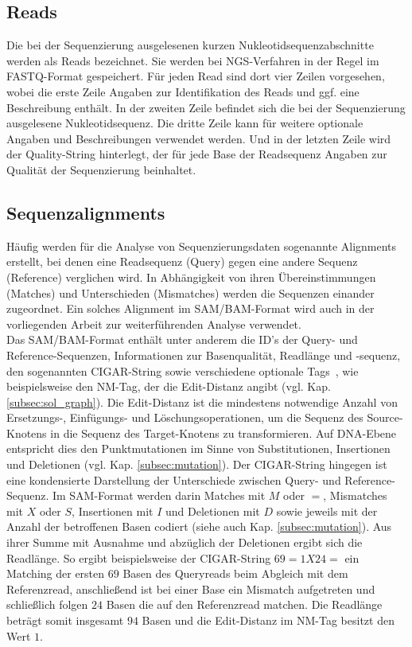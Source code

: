 \subsection{Reads} \label{subsec:fastq}

Die bei der Sequenzierung ausgelesenen kurzen Nukleotidsequenzabschnitte werden als Reads bezeichnet. Sie werden bei NGS-Verfahren in der Regel im FASTQ-Format gespeichert. Für jeden Read sind dort vier Zeilen vorgesehen, wobei die erste Zeile Angaben zur Identifikation des Reads und ggf. eine Beschreibung enthält. In der zweiten Zeile befindet sich die bei der Sequenzierung ausgelesene Nukleotidsequenz. Die dritte Zeile kann für weitere optionale Angaben und Beschreibungen verwendet werden. Und in der letzten Zeile wird der Quality-String hinterlegt, der für jede Base der Readsequenz Angaben zur Qualität der Sequenzierung beinhaltet. 

\subsection{Sequenzalignments} \label{subsec:samformat}

Häufig werden für die Analyse von Sequenzierungsdaten sogenannte Alignments erstellt, bei denen eine Readsequenz (Query) gegen eine andere Sequenz (Reference) verglichen wird. In Abhängigkeit von ihren Übereinstimmungen (Matches) und Unterschieden (Mismatches) werden die Sequenzen einander zugeordnet. Ein solches Alignment im SAM/BAM-Format wird auch in der vorliegenden Arbeit zur weiterführenden Analyse verwendet. \\

Das SAM/BAM-Format enthält unter anderem die ID's der Query- und Reference-Sequenzen, Informationen zur Basenqualität, Readlänge und -sequenz, den sogenannten CIGAR-String sowie verschiedene optionale Tags~\cite{sam_bam, li_2009}, wie beispielsweise den NM-Tag, der die Edit-Distanz angibt (vgl. Kap. \ref{subsec:sol_graph}). Die Edit-Distanz ist die mindestens notwendige Anzahl von Ersetzungs-, Einfügungs- und Löschungsoperationen, um die Sequenz des Source-Knotens in die Sequenz des Target-Knotens zu transformieren. Auf DNA-Ebene entspricht dies den Punktmutationen im Sinne von Substitutionen, Insertionen und Deletionen (vgl. Kap. \ref{subsec:mutation}). Der CIGAR-String hingegen ist eine kondensierte Darstellung der Unterschiede zwischen Query- und Reference-Sequenz. Im SAM-Format werden darin Matches mit $ M $ oder $ = $, Mismatches mit $ X $  oder $ S $,  Insertionen mit $ I $ und Deletionen mit $ D $ sowie jeweils mit der Anzahl der betroffenen Basen codiert (siehe auch Kap. \ref{subsec:mutation}). Aus ihrer Summe mit Ausnahme und abzüglich der Deletionen ergibt sich die Readlänge. So ergibt beispielsweise der CIGAR-String $ 69=1X24= $ ein Matching der ersten $ 69 $ Basen des Queryreads beim Abgleich mit dem Referenzread, anschließend ist bei einer Base ein Mismatch aufgetreten und schließlich folgen $ 24 $ Basen die auf den Referenzread matchen. Die Readlänge beträgt somit insgesamt $ 94 $ Basen und die Edit-Distanz im NM-Tag besitzt den Wert $ 1 $. \\

